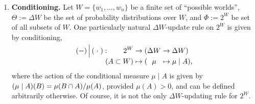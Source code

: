 \documentclass{article}
\begin{document}
\begin{enumerate}
    \item %
    \textbf{Conditioning.}
    Let $W = \{w_1, \ldots, w_n\}$ be a finite set of ``possible worlds'',
    $\Theta := \Delta W$ be the set of probability distributions over $W$,
    and $\Phi := 2^W$ be set of all subsets of $W$.
    One particularly natural $\Delta W$-update rule on $2^W$ is given by conditioning,
    \[
    \begin{aligned}
        (-) \smash{\,\Big|\,} (\;\cdot\;) : \qquad 2^W &\to (\Delta W \to \Delta W) \\
        (A \subset W) &\mapsto (  ~~\mu~~ \mapsto \mu \mid A ),
    \end{aligned}
    \]
    where the action of the conditional measure $\mu\mid A$ is given by $(\mu \mid A)(B) = {\mu(B \cap A)}/{\mu(A)}$, provided $\mu(A) > 0$,
    and can be defined arbitrarily otherwise.
    Of course, it is not the only $\Delta W$-updating rule for $2^W$.


\end{enumerate}
\end{document}
